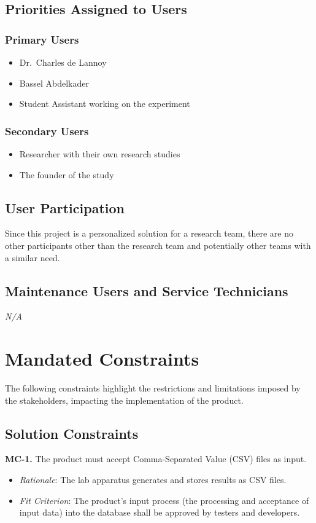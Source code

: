\documentclass[12pt]{article}
\begin{document}
\subsection{Priorities Assigned to Users}
\subsubsection{Primary Users}
\begin{itemize}
  \item Dr.\ Charles de Lannoy
  \item Bassel Abdelkader
  \item Student Assistant working on the experiment 
\end{itemize}

\subsubsection{Secondary Users}
\begin{itemize}
  \item Researcher with their own research studies 
  \item The founder of the study
\end{itemize}
\subsection{User Participation}
Since this project is a personalized solution for a research team, there are no
other participants other than the research team and potentially other teams with a
similar need. 
\subsection{Maintenance Users and Service Technicians}
\emph{N/A}

\section{Mandated Constraints}
The following constraints highlight the restrictions and limitations imposed by the stakeholders, impacting the implementation of the product. 
\subsection{Solution Constraints}
\textbf{MC-1.} The product must accept Comma-Separated Value (CSV) files as input.
\begin{itemize}
  \item \emph{Rationale}: The lab apparatus generates and stores results as CSV files.
  \item \emph{Fit Criterion}: The product's input process (the processing and acceptance of input data) into the database shall be approved by testers and developers.
\end{itemize}
\end{document}
